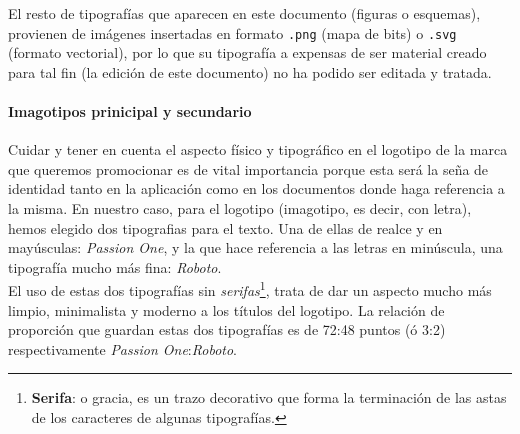 \documentclass[../ei103948-project-documentation.tex]{subfiles}
\begin{document}
                                El resto de tipografías que aparecen en este documento (figuras o esquemas), provienen de imágenes insertadas en formato \texttt{.png} (mapa de bits) o \texttt{.svg} (formato vectorial), por lo que su tipografía a expensas de ser material creado para tal fin (la edición de este documento) no ha podido ser editada y tratada.
                            
                                \paragraph*{Imagotipos prinicipal y secundario}
                                Cuidar y tener en cuenta el aspecto físico y tipográfico en el logotipo de la marca que queremos promocionar es de vital importancia porque esta será la seña de identidad tanto en la aplicación como en los documentos donde haga referencia a la misma. En nuestro caso, para el logotipo (imagotipo, es decir, con letra), hemos elegido dos tipografias para el texto. Una de ellas de realce y en mayúsculas: \textit{Passion One}, y la que hace referencia a las letras en minúscula, una tipografía mucho más fina: \textit{Roboto}.\\
                    
                                El uso de estas dos tipografías sin \textit{serifas}\footnote{\textbf{Serifa}: o gracia, es un trazo decorativo que forma la terminación de las astas de los caracteres de algunas tipografías.}, trata de dar un aspecto mucho más limpio, minimalista y moderno a los títulos del logotipo. La relación de proporción que guardan estas dos tipografías es de 72:48 puntos (ó 3:2) respectivamente \textit{Passion One}:\textit{Roboto}.
                    
\end{document}
